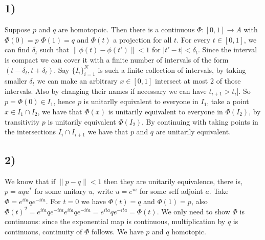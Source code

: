 \documentclass{article}
\begin{document}
\subsection*{1)}
Suppose $p$ and $q$ are homotopoic. Then there is a continuous $\Phi:[0,1]\to A$ with $\Phi(0)=p$
$\Phi(1)=q$ and $\Phi(t)$ a projection for all $t$. For every $t\in [0,1]$, we can find $\delta_t$
such that $\|\phi(t)-\phi(t')\|<1$ for $|t'-t|<\delta_t$. Since the interval is compact
we can cover it with a finite number of intervals of the form $(t-\delta_t,t+\delta_t)$. 
Say $\{I_i\}_{i=1}^{N}$ is such a finite collection of intervals, by taking smaller $\delta_t$
we can make an arbitrary $x\in [0,1]$ intersect at most $2$ of those intervals. Also by
changing their names if necessary we can have $t_{i+1}>t_i$|. So $p=\Phi(0)\in I_1$, hence
$p$ is unitarlly equivalent to everyone in $I_1$, take a point $x\in I_1\cap I_2$, we have 
that $\Phi(x)$ is unitarily equivalent to everyone in $\Phi(I_2)$, by transitivity $p$ is 
unitarily equivalent $\Phi(I_2)$. By continuing with taking points in the intersections 
$I_i\cap I_{i+1}$ we have that $p$ and $q$ are unitarily equivalent.  

\subsection*{2)}

We know that if $\|p-q\|<1$ then they are unitarily equivalence, there is, $p=uqu^\ast$ for 
some unitary $u$, write $u=e^{ia}$ for some self adjoint $a$. Take $\Phi=e^{ita}qe^{-ita}$.
For $t=0$ we have $\Phi(t)=q$ and $\Phi(1)=p$, also $\Phi(t)^2=e^{ita}qe^{-ita}e^{ita}qe^{-ita}=
e^{ita}qe^{-ita}=\Phi(t)$. We only need to show $\Phi$ is continuous: since the exponential
map is continuous, multiplication by $q$ is continuous, continuity of $\Phi$ follows. 
We have $p$ and $q$ homotopic.
\end{document}
